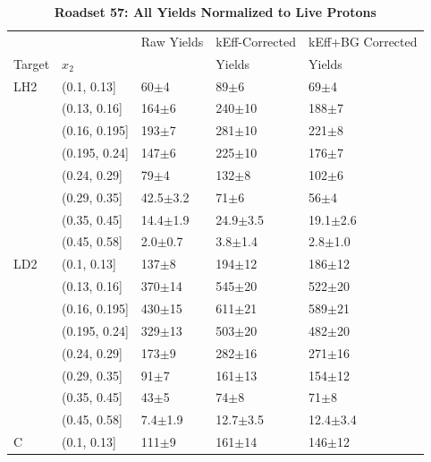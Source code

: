 \begin{table}
	\centering
	\caption*{\textbf{Roadset 57: All Yields Normalized to Live Protons}}
\begin{tabular}{lllll}
	\toprule
	&             &      Raw Yields &  kEff-Corrected &   kEff+BG Corrected \\
	Target & $x_2$ &                    &            Yields        &                Yields    \\
	\midrule
	LH2 & (0.1, 0.13] &             60$\pm$4 &             89$\pm$6 &             69$\pm$4 \\
	& (0.13, 0.16] &            164$\pm$6 &           240$\pm$10 &            188$\pm$7 \\
	& (0.16, 0.195] &            193$\pm$7 &           281$\pm$10 &            221$\pm$8 \\
	& (0.195, 0.24] &            147$\pm$6 &           225$\pm$10 &            176$\pm$7 \\
	& (0.24, 0.29] &             79$\pm$4 &            132$\pm$8 &            102$\pm$6 \\
	& (0.29, 0.35] &         42.5$\pm$3.2 &             71$\pm$6 &             56$\pm$4 \\
	& (0.35, 0.45] &         14.4$\pm$1.9 &         24.9$\pm$3.5 &         19.1$\pm$2.6 \\
	& (0.45, 0.58] &          2.0$\pm$0.7 &          3.8$\pm$1.4 &          2.8$\pm$1.0 \\
\rowcol 	LD2 & (0.1, 0.13] &            137$\pm$8 &           194$\pm$12 &           186$\pm$12 \\
\rowcol 	& (0.13, 0.16] &           370$\pm$14 &           545$\pm$20 &           522$\pm$20 \\
\rowcol 	& (0.16, 0.195] &           430$\pm$15 &           611$\pm$21 &           589$\pm$21 \\
\rowcol 	& (0.195, 0.24] &           329$\pm$13 &           503$\pm$20 &           482$\pm$20 \\
\rowcol 	& (0.24, 0.29] &            173$\pm$9 &           282$\pm$16 &           271$\pm$16 \\
\rowcol 	& (0.29, 0.35] &             91$\pm$7 &           161$\pm$13 &           154$\pm$12 \\
\rowcol 	& (0.35, 0.45] &             43$\pm$5 &             74$\pm$8 &             71$\pm$8 \\
\rowcol 	& (0.45, 0.58] &          7.4$\pm$1.9 &         12.7$\pm$3.5 &         12.4$\pm$3.4 \\
	C & (0.1, 0.13] &            111$\pm$9 &           161$\pm$14 &           146$\pm$12 \\

\end{tabular}
\end{table}
